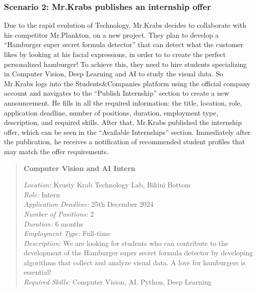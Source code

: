 \subsubsection{Scenario 2: Mr.Krabs publishes an internship offer}\label{subsubsec:scenario_2}
Due to the rapid evolution of Technology, Mr.Krabs decides to collaborate with his competitor Mr.Plankton, on a new project. They 
plan to develop a ``Hamburger super secret formula detector'' that can detect what the customer likes by looking at his facial expressions, in 
order to to create the perfect personalized hamburger! To achieve this, they need to hire students specializing in Computer Vision, Deep Learning and
AI to study the visual data. So Mr.Krabs logs into the Students\&Companies platform using the official company account
and navigates to the ``Publish Internship'' section to create a new announcement. He fills in all the required information: 
the title, location, role, application deadline, number of positions, duration, employment type, description, and required skills.
After that, Mr.Krabs published the internship offer, which can be seen in the ``Available Internships'' section. Immediately after 
the publication, he receives a notification of recommended student profiles that may match the offer requirements.
\begin{quote}
    \begin{center}
       \textbf{\textquotedbl Computer Vision and AI Intern\textquotedbl}
    \end{center}
    
    \textit{Location:} Krusty Krab Technology Lab, Bikini Bottom \\
    \textit{Role:} Intern \\
    \textit{Application Deadline:} 25th December 2024 \\
    \textit{Number of Positions:} 2 \\
    \textit{Duration:} 6 months \\
    \textit{Employment Type:} Full-time \\
    \textit{Description:} We are looking for students who can contribute to the development of the Hamburger super secret formula detector by developing 
    algorithms that collect and analyze visual data. A love for hamburgers is essential!\\
    \textit{Required Skills:} Computer Vision, AI, Python, Deep Learning
\end{quote}

